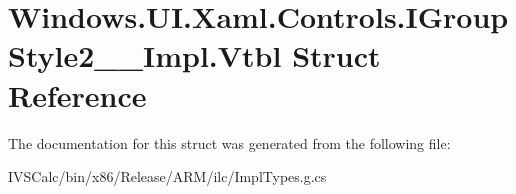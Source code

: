 \hypertarget{struct_windows_1_1_u_i_1_1_xaml_1_1_controls_1_1_i_group_style2_____impl_1_1_vtbl}{}\section{Windows.\+U\+I.\+Xaml.\+Controls.\+I\+Group\+Style2\+\_\+\+\_\+\+Impl.\+Vtbl Struct Reference}
\label{struct_windows_1_1_u_i_1_1_xaml_1_1_controls_1_1_i_group_style2_____impl_1_1_vtbl}


The documentation for this struct was generated from the following file\+:\begin{DoxyCompactItemize}
\item 
I\+V\+S\+Calc/bin/x86/\+Release/\+A\+R\+M/ilc/Impl\+Types.\+g.\+cs\end{DoxyCompactItemize}
